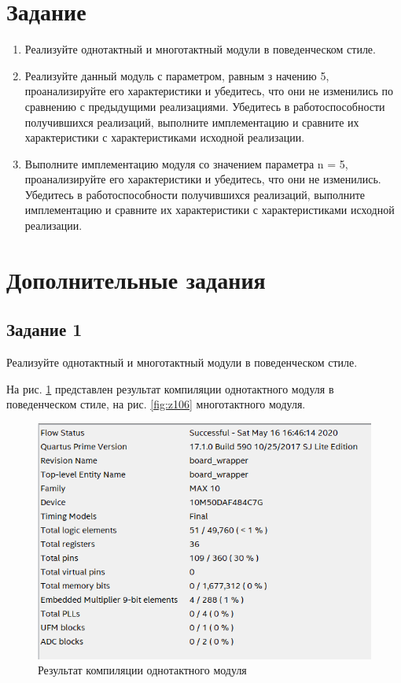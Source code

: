 \documentclass[a4paper,14pt]{article}
\begin{document}
	
	\tableofcontents
	\pagebreak
	\section{Задание}
	
	\begin{enumerate}
		\item Реализуйте однотактный и многотактный модули в поведенческом стиле.
		
		\item Реализуйте данный модуль с параметром, равным з начению 5, проанализируйте его	характеристики и убедитесь, что они не изменились по сравнению с предыдущими	реализациями. Убедитесь в работоспособности получившихся реализаций, выполните имплементацию и сравните их	характеристики с характеристиками исходной реализации.
	
		\item Выполните имплементацию модуля со значением параметра n = 5, проанализируйте его	характеристики и убедитесь, что они не изменились. Убедитесь в работоспособности получившихся реализаций, выполните имплементацию и сравните их
		характеристики с характеристиками исходной реализации.
		 
	\end{enumerate}
	
	\section{Дополнительные задания}
	
	\subsection{Задание 1}
	
	Реализуйте однотактный и многотактный модули в поведенческом стиле.
	
	На рис. \ref{fig:z103} представлен результат компиляции однотактного модуля в поведенческом стиле, на рис. \ref{fig:z106} многотактного модуля.
	
		\begin{figure}[H]
			\centering
			\includegraphics[width=0.8\linewidth]{images/z1_03}
			\caption{Результат компиляции однотактного модуля}
			\label{fig:z103}
		\end{figure}
			
\end{document}
